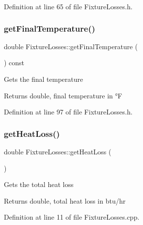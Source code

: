 Definition at line 65 of file Fixture\+Losses.\+h.

\mbox{\label{class_fixture_losses_a5c4259a78f78c675b063290f0fe6ea36}} 
\subsubsection{\texorpdfstring{get\+Final\+Temperature()}{getFinalTemperature()}}
{\footnotesize\ttfamily double Fixture\+Losses\+::get\+Final\+Temperature (\begin{DoxyParamCaption}{ }\end{DoxyParamCaption}) const\hspace{0.3cm}{\ttfamily [inline]}}

Gets the final temperature \begin{DoxyReturn}{Returns}
double, final temperature in °F 
\end{DoxyReturn}


Definition at line 97 of file Fixture\+Losses.\+h.

\mbox{\label{class_fixture_losses_a6829840bdf0607d52adaa9b5ee6ded75}} 
\subsubsection{\texorpdfstring{get\+Heat\+Loss()}{getHeatLoss()}}
{\footnotesize\ttfamily double Fixture\+Losses\+::get\+Heat\+Loss (\begin{DoxyParamCaption}{ }\end{DoxyParamCaption})}

Gets the total heat loss \begin{DoxyReturn}{Returns}
double, total heat loss in btu/hr 
\end{DoxyReturn}


Definition at line 11 of file Fixture\+Losses.\+cpp.

\mbox{\label{class_fixture_losses_aaa2e1042b71482b377e93d675909f78e}} 
